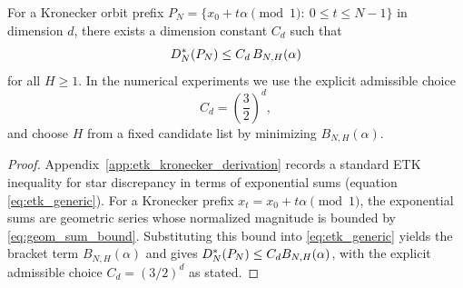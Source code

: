 \begin{theorem}
\label{thm:etk}
For a Kronecker orbit prefix $P_N=\{x_0+t\alpha\pmod 1:\ 0\le t\le N-1\}$ in dimension $d$,
there exists a dimension constant $C_d$ such that
\[
D_N^\ast(P_N)\le C_d\,B_{N,H}(\alpha)
\]
for all $H\ge 1$.
In the numerical experiments we use the explicit admissible choice
\[
C_d=\left(\frac{3}{2}\right)^d,
\]
and choose $H$ from a fixed candidate list by minimizing $B_{N,H}(\alpha)$.
\end{theorem}

\begin{proof}
Appendix~\ref{app:etk_kronecker_derivation} records a standard ETK inequality for star discrepancy in terms of exponential sums (equation \eqref{eq:etk_generic}).
For a Kronecker prefix $x_t=x_0+t\alpha\pmod 1$, the exponential sums are geometric series whose normalized magnitude is bounded by \eqref{eq:geom_sum_bound}.
Substituting this bound into \eqref{eq:etk_generic} yields the bracket term $B_{N,H}(\alpha)$ and gives $D_N^\ast(P_N)\le C_d B_{N,H}(\alpha)$, with the explicit admissible choice $C_d=(3/2)^d$ as stated.
\end{proof}



